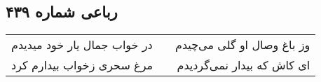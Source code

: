 \begin{center}
\section*{رباعی شماره ۴۳۹}
\label{sec:sh439}
\begin{longtable}{l p{0.5cm} r}
در خواب جمال یار خود میدیدم
&&
وز باغ وصال او گلی می‌چیدم
\\
مرغ سحری زخواب بیدارم کرد
&&
ای کاش که بیدار نمی‌گردیدم
\\
\end{longtable}
\end{center}
